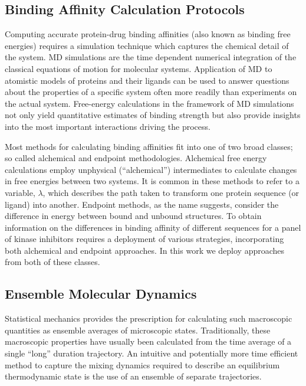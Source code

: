 \documentclass[conference]{IEEEtran}
\begin{document}
\subsection{Binding Affinity Calculation Protocols}\label{sec:bac}

Computing accurate protein-drug binding affinities (also known as binding free energies) requires a simulation technique which captures the chemical detail of the system. 
MD simulations are the time dependent numerical integration of the classical equations of motion for molecular systems. 
Application of MD to atomistic models of proteins and their ligands can be used to answer questions about the properties of a specific system often more readily than experiments on the actual system. 
Free-energy calculations in the framework of MD simulations not only yield quantitative estimates of binding strength but also provide insights into the most important interactions driving the process.

Most methods for calculating binding affinities fit into one of two broad classes; so called alchemical and endpoint methodologies. 
Alchemical free energy calculations employ unphysical (“alchemical”) intermediates to calculate changes in free energies between two systems. 
It is common in these methods to refer to a variable, $\lambda$, which describes the path taken to transform one protein sequence (or ligand) into another. 
Endpoint methods, as the name suggests, consider the difference in energy between bound and unbound structures. 
To obtain information on the differences in binding affinity of different sequences for a panel of kinase inhibitors requires a deployment of various strategies, incorporating both alchemical and endpoint approaches. 
In this work we deploy approaches from both of these classes.

\subsection{Ensemble Molecular Dynamics}\label{sec:emd}

Statistical mechanics provides the prescription for calculating such macroscopic quantities as ensemble averages of microscopic states. Traditionally, these macroscopic properties have usually been calculated from the time average of a single “long” duration trajectory. An intuitive and potentially more time efficient method to capture the mixing dynamics required to describe an equilibrium thermodynamic state is the use of an ensemble of separate trajectories. \cite{Coveney2016}
\end{document}

